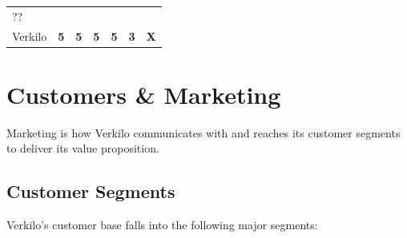 \documentclass[11pt,openany]{book}
\begin{document}
\begin{longtable}[]{@{}lcccccc@{}}
\begin{minipage}[t]{0.10\columnwidth}
??\strut
\end{minipage}\tabularnewline
\begin{minipage}[t]{0.29\columnwidth}\raggedright
Verkilo\strut
\end{minipage} & \begin{minipage}[t]{0.09\columnwidth}\centering
\textbf{5}\strut
\end{minipage} & \begin{minipage}[t]{0.08\columnwidth}\centering
\textbf{5}\strut
\end{minipage} & \begin{minipage}[t]{0.09\columnwidth}\centering
\textbf{5}\strut
\end{minipage} & \begin{minipage}[t]{0.07\columnwidth}\centering
\textbf{5}\strut
\end{minipage} & \begin{minipage}[t]{0.10\columnwidth}\centering
\textbf{3}\strut
\end{minipage} & \begin{minipage}[t]{0.10\columnwidth}\centering
\textbf{X}\strut
\end{minipage}\tabularnewline
\bottomrule
\end{longtable}

\hypertarget{customers-marketing}{%
\chapter{Customers \& Marketing}\label{customers-marketing}}

Marketing is how Verkilo communicates with and reaches its customer
segments to deliver its value proposition.

\hypertarget{customer-segments}{%
\section{Customer Segments}\label{customer-segments}}

Verkilo's customer base falls into the following major segments:
\end{document}
